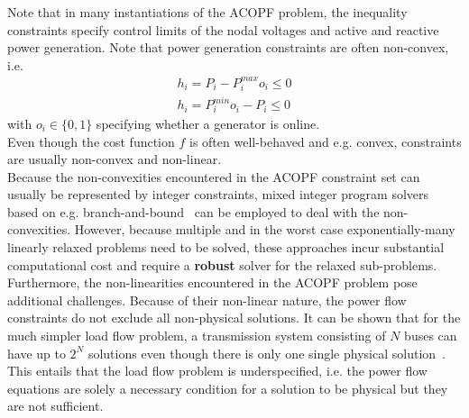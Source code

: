 \documentclass[11pt]{cmuthesis} %
\begin{document}
Note that in many instantiations of the ACOPF problem, the inequality constraints specify control limits of the nodal voltages and active and reactive power generation. Note that power generation constraints are often non-convex, i.e.
\begin{align*}
h_i = P_i - P^{max}_i o_i \leq 0\\
h_i =  P^{min}_i o_i - P_i \leq 0
\end{align*}
with $o_i \in \{0,1\}$ specifying whether a generator is online.\\
Even though the cost function $f$ is often well-behaved and e.g. convex, constraints are usually non-convex and non-linear.\\

Because the non-convexities encountered in the ACOPF constraint set can usually be represented by integer constraints, mixed integer program solvers based on e.g. branch-and-bound~\cite{lawler1966branch} can be employed to deal with the non-convexities. However, because multiple and in the worst case exponentially-many linearly relaxed problems need to be solved, these approaches incur substantial computational cost and require a \textbf{robust} solver for the relaxed sub-problems.\\

Furthermore, the non-linearities encountered in the ACOPF problem pose additional challenges. Because of their non-linear nature, the power flow constraints do not exclude all non-physical solutions. It can be shown that for the much simpler load flow problem, a transmission system consisting of $N$ buses can have up to $2^N$ solutions even though there is only one single physical solution~\cite{thorp1997load,tamura1983relationship}. This entails that the load flow problem is underspecified, i.e. the power flow equations are solely a necessary condition for a solution to be physical but they are not sufficient.
\end{document}
